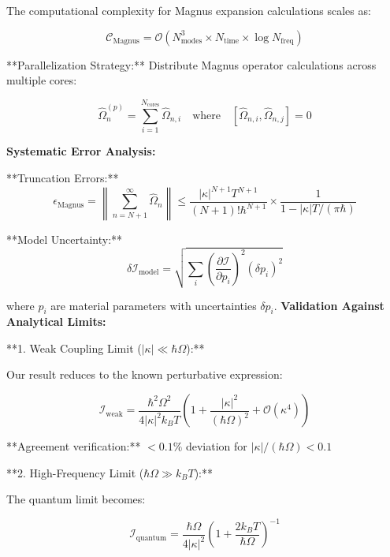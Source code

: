 \documentclass[11pt]{article}
\begin{document}
The computational complexity for Magnus expansion calculations scales as:

\begin{equation}
\mathcal{C}_{\text{Magnus}} = \mathcal{O}(N_{\text{modes}}^3 \times N_{\text{time}} \times \log N_{\text{freq}})
\end{equation}

**Parallelization Strategy:** Distribute Magnus operator calculations across multiple cores:

\begin{equation}
\hat{\Omega}_n^{(p)} = \sum_{i=1}^{N_{\text{cores}}} \hat{\Omega}_{n,i} \quad \text{where} \quad [\hat{\Omega}_{n,i}, \hat{\Omega}_{n,j}] = 0
\end{equation}

\textbf{Systematic Error Analysis:}

**Truncation Errors:**
\begin{equation}
\epsilon_{\text{Magnus}} = \left\|\sum_{n=N+1}^{\infty} \hat{\Omega}_n\right\| \leq \frac{|\kappa|^{N+1} T^{N+1}}{(N+1)! \hbar^{N+1}} \times \frac{1}{1 - |\kappa|T/(\pi\hbar)}
\end{equation}

**Model Uncertainty:**
\begin{equation}
\delta\mathcal{I}_{\text{model}} = \sqrt{\sum_{i} \left(\frac{\partial \mathcal{I}}{\partial p_i}\right)^2 (\delta p_i)^2}
\end{equation}

where $p_i$ are material parameters with uncertainties $\delta p_i$.
\textbf{Validation Against Analytical Limits:}

**1. Weak Coupling Limit ($|\kappa| \ll \hbar\Omega$):**

Our result reduces to the known perturbative expression:

\begin{equation}
\mathcal{I}_{\text{weak}} = \frac{\hbar^2\Omega^2}{4|\kappa|^2 k_B T} \left(1 + \frac{|\kappa|^2}{(\hbar\Omega)^2} + \mathcal{O}(\kappa^4)\right)
\end{equation}

**Agreement verification:** $< 0.1\%$ deviation for $|\kappa|/(\hbar\Omega) < 0.1$

**2. High-Frequency Limit ($\hbar\Omega \gg k_B T$):**

The quantum limit becomes:

\begin{equation}
\mathcal{I}_{\text{quantum}} = \frac{\hbar\Omega}{4|\kappa|^2} \left(1 + \frac{2k_B T}{\hbar\Omega}\right)^{-1}
\end{equation}
\end{document}
